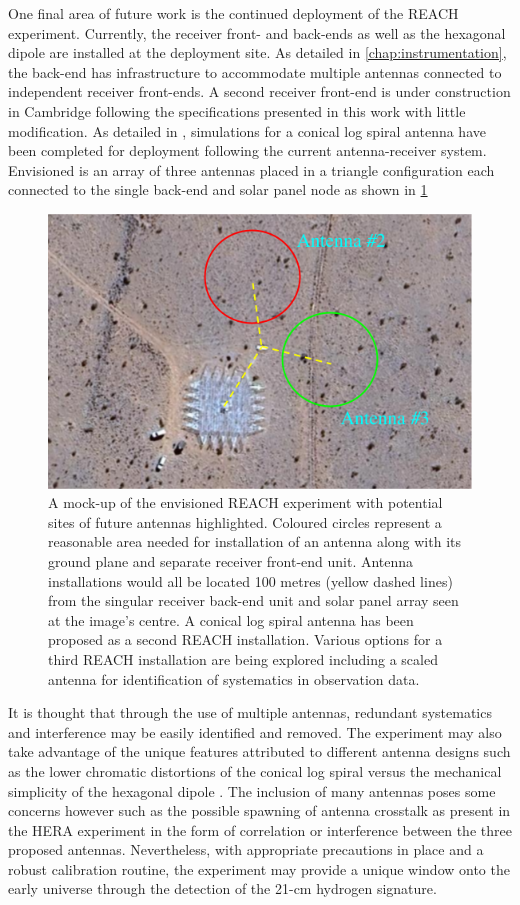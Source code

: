 One final area of future work is the continued deployment of the REACH experiment. Currently, the receiver front- and back-ends as well as the hexagonal dipole are installed at the deployment site. As detailed in \cref{chap:instrumentation}, the back-end has infrastructure to accommodate multiple antennas connected to independent receiver front-ends. A second receiver front-end is under construction in Cambridge following the specifications presented in this work with little modification. As detailed in \citet{reach}, simulations for a conical log spiral antenna have been completed for deployment following the current antenna-receiver system. Envisioned is an array of three antennas placed in a triangle configuration each connected to the single back-end and solar panel node as shown in \cref{fig:reach_prime}
\begin{figure}
    \centering
    \includegraphics[width=.7\textwidth]{reach_prime}
    \caption{A mock-up of the envisioned REACH experiment with potential sites of future antennas highlighted. Coloured circles represent a reasonable area needed for installation of an antenna along with its ground plane and separate receiver front-end unit. Antenna installations would all be located 100 metres (yellow dashed lines) from the singular receiver back-end unit and solar panel array seen at the image's centre. A conical log spiral antenna has been proposed as a second REACH installation. Various options for a third REACH installation are being explored including a scaled antenna for identification of systematics in observation data.}
    \label{fig:reach_prime}
\end{figure}
It is thought that through the use of multiple antennas, redundant systematics and interference may be easily identified and removed. The experiment may also take advantage of the unique features attributed to different antenna designs such as the lower chromatic distortions of the conical log spiral versus the mechanical simplicity of the hexagonal dipole \citep{dom_antenna,john_antenna,reach}. The inclusion of many antennas poses some concerns however such as the possible spawning of antenna crosstalk as present in the HERA experiment \citep{hera_crosstalk} in the form of correlation or interference between the three proposed antennas. Nevertheless, with appropriate precautions in place and a robust calibration routine, the experiment may provide a unique window onto the early universe through the detection of the 21-cm hydrogen signature.

